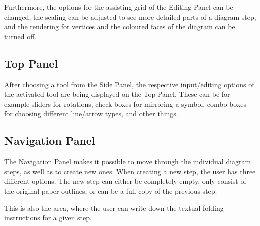 Furthermore, the options for the assisting grid of the Editing Panel can be changed, the scaling can be adjusted to see more detailed parts of a diagram step, and the rendering for vertices and the coloured faces of the diagram can be turned off.

\subsection{Top Panel}
\label{sec:topPanel}

After choosing a tool from the Side Panel, the respective input/editing options of the activated tool are being displayed on the Top Panel. These can be for example sliders for rotations, check boxes for mirroring a symbol, combo boxes for choosing different line/arrow types, and other things.


\subsection{Navigation Panel}
\label{sec:navigationPanel}

The Navigation Panel makes it possible to move through the individual diagram steps, as well as to create new ones. When creating a new step, the user has three different options. The new step can either be completely empty, only consist of the original paper outlines, or can be a full copy of the previous step.

This is also the area, where the user can write down the textual folding instructions for a given step.
